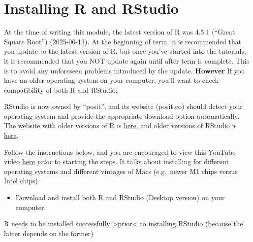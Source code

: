 \documentclass[
]{book}
\providecommand{\tightlist}{%
  \setlength{\itemsep}{0pt}\setlength{\parskip}{0pt}}
\begin{document}
\section{Installing R and RStudio}\label{install_R_Rstudio}

At the time of writing this module, the latest version of R was 4.5.1 (``Great Square Root'') (2025-06-13). At the beginning of term, it is recommended that you update to the latest version of R, but once you've started into the tutorials, it is recommended that you NOT update again until after term is complete. This is to avoid any unforeseen problems introduced by the update. \textbf{However} If you have an older operating system on your computer, you'll want to check compatibility of both R and RStudio.

RStudio is now owned by ``posit'', and its website (posit.co) should detect your operating system and provide the appropriate download option automatically. The website with older versions of R is \href{https://cran.r-project.org/bin/macosx/}{here}, and older versions of RStudio is \href{https://docs.posit.co/previous-versions/rstudio/}{here}.

Follow the instructions below, and you are encouraged to view this YouTube video \href{https://www.youtube.com/watch?v=tgPuB-iNww0}{here} \emph{prior} to starting the steps. It talks about installing for different operating systems and different vintages of Macs (e.g.~newer M1 chips versus Intel chips).

\begin{itemize}
\tightlist
\item
  Download and install both R and RStudio (Desktop version) on your computer.
\end{itemize}

R needs to be installed successfully \textgreater prior\textless{} to installing RStudio (because the latter depends on the former)
\end{document}
